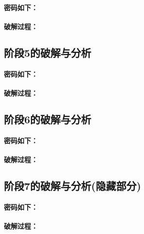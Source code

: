 \paragraph{密码如下：}

\paragraph{破解过程：}

\subsection{阶段5的破解与分析}

\paragraph{密码如下：}

\paragraph{破解过程：}

\subsection{阶段6的破解与分析}

\paragraph{密码如下：}

\paragraph{破解过程：}

\subsection{阶段7的破解与分析(隐藏部分)}

\paragraph{密码如下：}

\paragraph{破解过程：}
